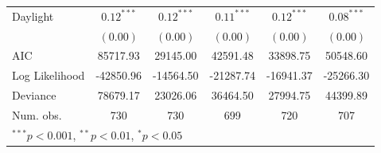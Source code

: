 \documentclass [11pt, proquest] {uwthesis}[2015/03/03]
\begin{document}
\begin{table}
\begin{center}
\begin{tabular}{l c c c c c }
Daylight       & $0.12^{***}$  & $0.12^{***}$  & $0.11^{***}$  & $0.12^{***}$  & $0.08^{***}$  \\
               & $(0.00)$      & $(0.00)$      & $(0.00)$      & $(0.00)$      & $(0.00)$      \\
\hline
AIC            & 85717.93      & 29145.00      & 42591.48      & 33898.75      & 50548.60      \\
Log Likelihood & -42850.96     & -14564.50     & -21287.74     & -16941.37     & -25266.30     \\
Deviance       & 78679.17      & 23026.06      & 36464.50      & 27994.75      & 44399.89      \\
Num. obs.      & 730           & 730           & 699           & 720           & 707           \\
\hline
\multicolumn{6}{l}{\scriptsize{$^{***}p<0.001$, $^{**}p<0.01$, $^*p<0.05$}}
\end{tabular}
\label{tbl:multilocations}
\end{center}
\end{table}



\end{document}
